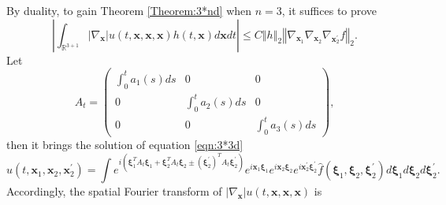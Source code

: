 \documentclass[reqno]{amsart}
\theoremstyle{plain}
\numberwithin{equation}{section}
\begin{document}
By duality, to gain Theorem \ref{Theorem:3*nd} when $n=3$, it suffices to
prove\begin{equation*}
\left\vert \int_{\mathbb{R}^{3+1}}\left\vert \nabla _{\mathbf{x}}\right\vert
u(t,\mathbf{x},\mathbf{x},\mathbf{x})h(t,\mathbf{x})d\mathbf{x}dt\right\vert
\leqslant C\left\Vert h\right\Vert _{2}\left\Vert \nabla _{\mathbf{x}_{1}}\nabla _{\mathbf{x}_{2}}\nabla _{\mathbf{x}_{2}^{\prime }}f\right\Vert
_{2}.
\end{equation*}Let\begin{equation*}
A_{t}=\begin{pmatrix}
\int_{0}^{t}a_{1}(s)ds & 0 & 0 \\ 
0 & \int_{0}^{t}a_{2}(s)ds & 0 \\ 
0 & 0 & \int_{0}^{t}a_{3}(s)ds\end{pmatrix},
\end{equation*}then it brings the solution of equation \ref{eqn:3*3d}\begin{equation*}
u(t,\mathbf{x}_{1},\mathbf{x}_{2},\mathbf{x}_{2}^{\prime })=\int e^{i(\mathbf{\xi }_{1}^{T}A_{t}\mathbf{\xi }_{1}+\mathbf{\xi }_{2}^{T}A_{t}\mathbf{\xi }_{2}\pm \left( \mathbf{\xi }_{2}^{\prime }\right) ^{T}A_{t}\mathbf{\xi }_{2}^{\prime })}e^{i\mathbf{x}_{1}\mathbf{\xi }_{1}}e^{i\mathbf{x}_{2}\mathbf{\xi }_{2}}e^{i\mathbf{x}_{2}^{\prime }\mathbf{\xi }_{2}^{\prime }}\hat{f}(\mathbf{\xi }_{1},\mathbf{\xi }_{2},\mathbf{\xi }_{2}^{\prime })d\mathbf{\xi }_{1}d\mathbf{\xi }_{2}d\mathbf{\xi }_{2}^{\prime }.
\end{equation*}Accordingly, the spatial Fourier transform of $\left\vert \nabla _{\mathbf{x}}\right\vert u(t,\mathbf{x},\mathbf{x},\mathbf{x})$ is 
\end{document}
